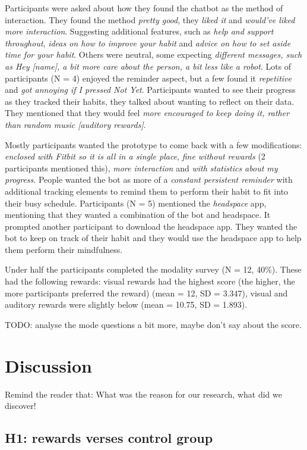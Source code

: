 \documentclass{scaffold/sigchi}
\begin{document}
Participants were asked about how they found the chatbot as the method of interaction. They found the method \textit{pretty good}, they \textit{liked it} and \textit{would've liked more interaction}. Suggesting additional features, such as \textit{help and support throughout}, \textit{ideas on how to improve your habit} and \textit{advice on how to set aside time for your habit}. Others were neutral, some expecting \textit{different messages, such as Hey [name], a bit more care about the person, a bit less like a robot}. Lots of participants (N = 4) enjoyed the reminder aspect, but a few found it \textit{repetitive} and \textit{got annoying if I pressed Not Yet}. Participants wanted to see their progress as they tracked their habits, they talked about wanting to reflect on their data. They mentioned that they would feel \textit{more encouraged to keep doing it, rather than random music [auditory rewards]}.


Mostly participants wanted the prototype to come back with a few modifications: \textit{enclosed with Fitbit so it is all in a single place}, \textit{fine without rewards} (2 participants mentioned this), \textit{more interaction} and \textit{with statistics about my progress}. People wanted the bot as more of a \textit{constant persistent reminder} with additional tracking elements to remind them to perform their habit to fit into their busy schedule. Participants (N = 5) mentioned the \textit{headspace}\cite{headspace_app} app, mentioning that they wanted a combination of the bot and headspace. It prompted another participant to download the headspace app. They wanted the bot to keep on track of their habit and they would use the headspace app to help them perform their mindfulness.

Under half the participants completed the modality survey (N = 12, 40\%). These had the following rewards: visual rewards had the highest score (the higher, the more participants preferred the reward) (mean = 12, SD = 3.347), visual and auditory rewards were slightly below (mean = 10.75, SD = 1.893).

TODO: analyse the mode questions a bit more, maybe don't say about the score.

\section{Discussion}
Remind the reader that: What was the reason for our research, what did we discover!

\subsection{H1: rewards verses control group}
\end{document}
